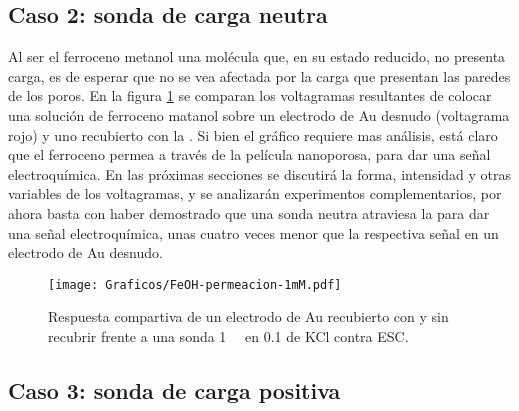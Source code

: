 	\subsection{Caso 2: sonda de carga neutra}

		Al ser el ferroceno metanol una molécula que, en su estado reducido, no presenta carga, es de esperar que no se vea afectada por la carga que presentan las paredes de los poros. En la figura \ref{fig:permeacion} se comparan los voltagramas resultantes de colocar una solución de ferroceno matanol sobre un electrodo de Au desnudo (voltagrama rojo) y uno recubierto con la \pdm.  Si bien el gráfico  requiere mas análisis, está claro que el ferroceno permea a través de la película nanoporosa, para dar una señal electroquímica. En las próximas secciones se discutirá la forma, intensidad y otras variables de los voltagramas, y se analizarán experimentos complementarios, por ahora basta con haber demostrado que una sonda neutra atraviesa la \pdm\space para dar una señal electroquímica, unas cuatro veces menor que la respectiva señal en un electrodo de Au desnudo.	

		\begin{figure}[ht]
				\centering
		 	    \texttt{[image: Graficos/FeOH-permeacion-1mM.pdf]}
		        \caption[Permeación ferroceno metanol]{Respuesta compartiva de un electrodo de Au recubierto con \pdmF\space y sin recubrir frente a una sonda \fc \SI{1}{\milli\Molar} en \SI{0.1}{\Molar} de KCl contra ESC.}
		        \label{fig:permeacion}
		      	\end{figure}

	\subsection{Caso 3: sonda de carga positiva}

